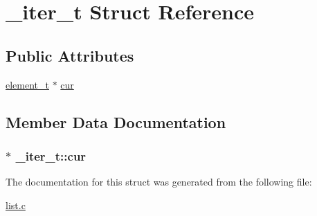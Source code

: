 \hypertarget{struct__iter__t}{\section{\-\_\-iter\-\_\-t Struct Reference}
\label{struct__iter__t}
}
\subsection*{Public Attributes}
\begin{DoxyCompactItemize}
\item 
\hyperlink{structelement__t}{element\-\_\-t} $\ast$ \hyperlink{struct__iter__t_a64fbbb56247d4958f1e93a2d43bd8c85}{cur}
\end{DoxyCompactItemize}


\subsection{Member Data Documentation}
\hypertarget{struct__iter__t_a64fbbb56247d4958f1e93a2d43bd8c85}{
\subsubsection[{cur}]{$\ast$ \-\_\-iter\-\_\-t\-::cur}}\label{struct__iter__t_a64fbbb56247d4958f1e93a2d43bd8c85}


The documentation for this struct was generated from the following file\-:\begin{DoxyCompactItemize}
\item 
\hyperlink{list_8c}{list.\-c}\end{DoxyCompactItemize}
